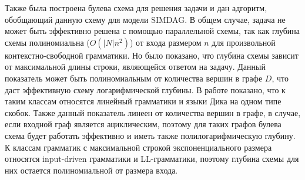 \documentclass{spbau-diploma}
\begin{document}
Также была построена булева схема для решения задачи и дан адгоритм, обобщающий данную схему для модели SIMDAG. В общем случае, задача не может быть эффективно решена с помощью параллельной схемы, так как глубина схемы полиномиальна ($O(|N|n^2)$) от входа размером $n$ для произвольной контекстно-свободной грамматики. Но было показано, что глубина схемы зависит от максимальной длины строки, являющейся ответом на задачу. Данный показатель может быть полиномиальным от количества вершин в графе $D$, что даст эффективную схему логарифмической глубины. В работе показано, что к таким классам относятся линейный грамматики и языки Дика на одном типе скобок. Также данный показатель линеен от количества вершин в графе, в случае, если входной граф является ациклическим, поэтому для таких графов булева схема будет работать эффективно и иметь также полилогарифмическую глубину. К классам грамматик с максимальной строкой экспоненциального размера относятся input-driven грамматики и LL-грамматики, поэтому глубина схемы для них остается полиномиальной от размера входа.



\end{document}
